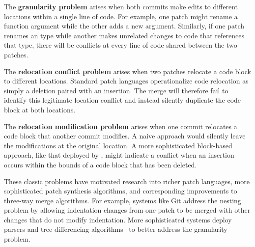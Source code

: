 The \textbf{granularity problem} 
arises when both commits make edits to different locations within a single line of code. For example, one patch might rename a function argument while the other adds a new argument. 
Similarly, if one patch renames an type while another 
makes unrelated changes to code that references that type,
there will be conflicts at every line of code shared between the two patches. 
 
The \textbf{relocation conflict problem} arises when two patches relocate a code block to different locations. 
Standard patch languages operationalize code relocation as simply a deletion paired with an insertion. The merge will therefore fail to identify this legitimate location conflict and instead silently duplicate the code block at both locations.

The \textbf{relocation modification problem} arises when one commit relocates a code block that another commit modifies. 
A naive approach would silently leave the modifications at the original location. A more sophisticated block-based approach, like that deployed by , might indicate a conflict when an insertion occurs within the bounds of a code block that has been deleted.

These classic problems have motivated research into richer patch languages, more sophisticated patch synthesis algorithms, and corresponding improvements to three-way merge algorithms. 
For example, systems like Git address the nesting problem by allowing indentation changes from one patch to be merged with other changes that do not modify indentation. 
More sophisticated systems deploy parsers and tree differencing algorithms~\cite{DBLP:conf/sigmod/ChawatheG97, DBLP:journals/tse/FluriWPG07,DBLP:conf/kbse/FalleriMBMM14,DBLP:conf/doceng/Lindholm04,DBLP:conf/fase/NguyenNPN10,DBLP:journals/scp/SchwagerlUW15} to better
address the granularity problem.

